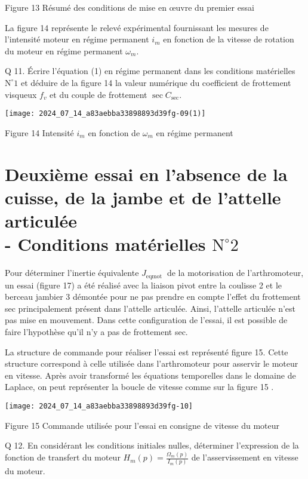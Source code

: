 Figure 13 Résumé des conditions de mise en œuvre du premier essai

La figure 14 représente le relevé expérimental fournissant les mesures de l'intensité moteur en régime permanent $i_{m}$ en fonction de la vitesse de rotation du moteur en régime permanent $\omega_{m}$.

Q 11. Écrire l'équation (1) en régime permanent dans les conditions matérielles $\mathrm{N}^{\circ} 1$ et déduire de la figure 14 la valeur numérique du coefficient de frottement visqueux $f_{v}$ et du couple de frottement $\sec C_{\mathrm{sec}}$.

\begin{center}
\texttt{[image: 2024\_07\_14\_a83aebba33898893d39fg-09(1)]}
\end{center}

Figure 14 Intensité $i_{m}$ en fonction de $\omega_{m}$ en régime permanent

\section*{Deuxième essai en l'absence de la cuisse, de la jambe et de l'attelle articulée \\
 - Conditions matérielles $\mathrm{N}^{\circ} 2$}
Pour déterminer l'inertie équivalente $J_{\text {eqmot }}$ de la motorisation de l'arthromoteur, un essai (figure 17) a été réalisé avec la liaison pivot entre la coulisse 2 et le berceau jambier 3 démontée pour ne pas prendre en compte l'effet du frottement sec principalement présent dans l'attelle articulée. Ainsi, l'attelle articulée n'est pas mise en mouvement. Dans cette configuration de l'essai, il est possible de faire l'hypothèse qu'il n'y a pas de frottement sec.

La structure de commande pour réaliser l'essai est représenté figure 15. Cette structure correspond à celle utilisée dans l'arthromoteur pour asservir le moteur en vitesse. Après avoir transformé les équations temporelles dans le domaine de Laplace, on peut représenter la boucle de vitesse comme sur la figure 15 .

\begin{center}
\texttt{[image: 2024\_07\_14\_a83aebba33898893d39fg-10]}
\end{center}

Figure 15 Commande utilisée pour l'essai en consigne de vitesse du moteur

Q 12. En considérant les conditions initiales nulles, déterminer l'expression de la fonction de transfert du moteur $H_{m}(p)=\frac{\Omega_{m}(p)}{I_{m}(p)}$ de l'asservissement en vitesse du moteur.

